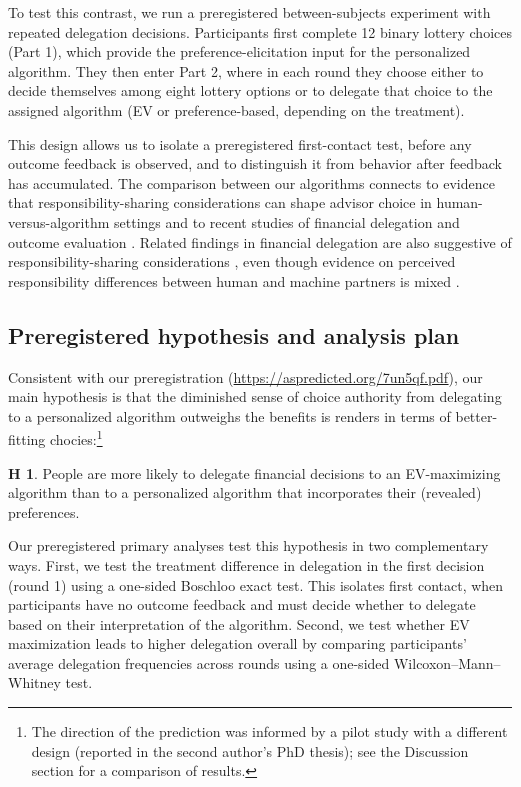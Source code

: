 \documentclass[a4paper, 12pt, fleqn]{article}
\theoremstyle{definition}
\newtheorem{hyp}{H}
\begin{document}
To test this contrast, we run a preregistered between-subjects experiment with repeated delegation decisions. Participants first complete 12 binary lottery choices (Part 1), which provide the preference-elicitation input for the personalized algorithm. They then enter Part 2, where in each round they choose either to decide themselves among eight lottery options or to delegate that choice to the assigned algorithm (EV or preference-based, depending on the treatment). 

This design allows us to isolate a preregistered first-contact test, before any outcome feedback is observed, and to distinguish it from behavior after feedback has accumulated. 
The comparison between our algorithms connects to evidence that responsibility-sharing considerations can shape advisor choice in human-versus-algorithm settings \citep{Gazit2023} and to recent studies of financial delegation and outcome evaluation \citep{Ismagilova2025}. Related findings in financial delegation are also suggestive of responsibility-sharing considerations \citep{Werner2026}, even though evidence on perceived responsibility differences between human and machine partners is mixed \citep{Kirchkamp2019}.

\subsection*{Preregistered hypothesis and analysis plan}
Consistent with our preregistration ({\scriptsize\url{https://aspredicted.org/7un5qf.pdf}}), our main hypothesis is that the diminished sense of choice authority from delegating to a personalized algorithm outweighs the benefits is renders in terms of better-fitting chocies:\footnote{The direction of the prediction was informed by a pilot study with a different design (reported in the second author's PhD thesis); see the Discussion section for a comparison of results.}
\begin{hyp}
	People are more likely to delegate financial decisions to an EV-maximizing algorithm than to a personalized algorithm that incorporates their (revealed) preferences.
\end{hyp}

Our preregistered primary analyses test this hypothesis in two complementary ways. First, we test the treatment difference in delegation in the first decision (round 1) using a one-sided Boschloo exact test. This isolates first contact, when participants have no outcome feedback and must decide whether to delegate based on their interpretation of the algorithm. Second, we test whether EV maximization leads to higher delegation overall by comparing participants' average delegation frequencies across rounds using a one-sided Wilcoxon--Mann--Whitney test.
\end{document}
